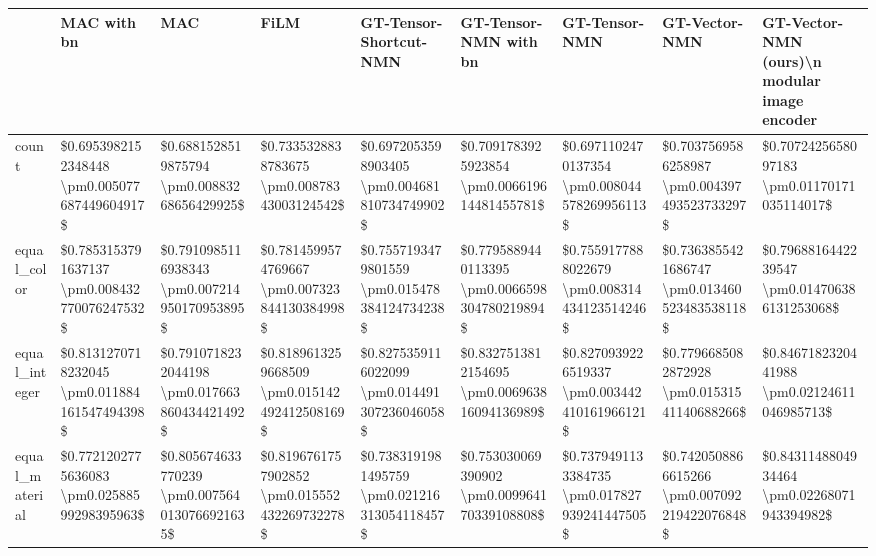 \begin{tabular}{lllllllll}
\toprule
{} &                                     MAC with bn &                                           MAC &                                           FiLM &                         GT-Tensor-Shortcut-NMN &                          GT-Tensor-NMN with bn &                                  GT-Tensor-NMN &                                  GT-Vector-NMN &  GT-Vector-NMN (ours)\textbackslash n modular image encoder \\
\midrule
count          &    \$0.6953982152348448 \textbackslash pm0.005077687449604917\$ &   \$0.6881528519875794 \textbackslash pm0.00883268656429925\$ &    \$0.7335328838783675 \textbackslash pm0.00878343003124542\$ &   \$0.6972053598903405 \textbackslash pm0.004681810734749902\$ &   \$0.7091783925923854 \textbackslash pm0.006619614481455781\$ &   \$0.6971102470137354 \textbackslash pm0.008044578269956113\$ &   \$0.7037569586258987 \textbackslash pm0.004397493523733297\$ &   \$0.7072425658097183 \textbackslash pm0.01170171035114017\$ \\
equal\_color    &    \$0.7853153791637137 \textbackslash pm0.008432770076247532\$ &  \$0.7910985116938343 \textbackslash pm0.007214950170953895\$ &   \$0.7814599574769667 \textbackslash pm0.007323844130384998\$ &   \$0.7557193479801559 \textbackslash pm0.015478384124734238\$ &  \$0.7795889440113395 \textbackslash pm0.0066598304780219894\$ &   \$0.7559177888022679 \textbackslash pm0.008314434123514246\$ &   \$0.7363855421686747 \textbackslash pm0.013460523483538118\$ &  \$0.7968816442239547 \textbackslash pm0.014706386131253068\$ \\
equal\_integer  &    \$0.8131270718232045 \textbackslash pm0.011884161547494398\$ &  \$0.7910718232044198 \textbackslash pm0.017663860434421492\$ &   \$0.8189613259668509 \textbackslash pm0.015142492412508169\$ &   \$0.8275359116022099 \textbackslash pm0.014491307236046058\$ &   \$0.8327513812154695 \textbackslash pm0.006963816094136989\$ &   \$0.8270939226519337 \textbackslash pm0.003442410161966121\$ &    \$0.7796685082872928 \textbackslash pm0.01531541140688266\$ &   \$0.8467182320441988 \textbackslash pm0.02124611046985713\$ \\
equal\_material &     \$0.7721202775636083 \textbackslash pm0.02588599298395963\$ &  \$0.805674633770239 \textbackslash pm0.0075640130766921635\$ &   \$0.8196761757902852 \textbackslash pm0.015552432269732278\$ &   \$0.7383191981495759 \textbackslash pm0.021216313054118457\$ &    \$0.753030069390902 \textbackslash pm0.009964170339108808\$ &   \$0.7379491133384735 \textbackslash pm0.017827939241447505\$ &   \$0.7420508866615266 \textbackslash pm0.007092219422076848\$ &   \$0.8431148804934464 \textbackslash pm0.02268071943394982\$ \\

\end{tabular}
